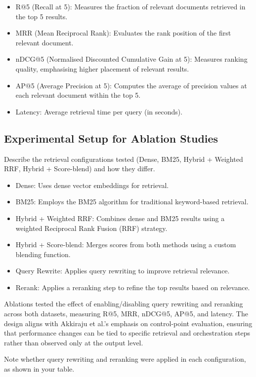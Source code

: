 \begin{spacing}{1.5}
\begin{itemize}
    \item R@5 (Recall at 5): Measures the fraction of relevant documents retrieved in the top 5 results.
    \item MRR (Mean Reciprocal Rank): Evaluates the rank position of the first relevant document.
    \item nDCG@5 (Normalised Discounted Cumulative Gain at 5): Measures ranking quality, emphasising higher placement of relevant results.
    \item AP@5 (Average Precision at 5): Computes the average of precision values at each relevant document within the top 5.
    \item Latency: Average retrieval time per query (in seconds).
\end{itemize}

\subsection{Experimental Setup for Ablation Studies}
Describe the retrieval configurations tested (Dense, BM25, Hybrid + Weighted RRF, Hybrid + Score-blend) and how they differ.
\begin{itemize}
    \item Dense: Uses dense vector embeddings for retrieval.
    \item BM25: Employs the BM25 algorithm for traditional keyword-based retrieval.
    \item Hybrid + Weighted RRF: Combines dense and BM25 results using a weighted Reciprocal Rank Fusion (RRF) strategy.
    \item Hybrid + Score-blend: Merges scores from both methods using a custom blending function.
    \item Query Rewrite: Applies query rewriting to improve retrieval relevance.
    \item Rerank: Applies a reranking step to refine the top results based on relevance.
\end{itemize}
Ablations tested the effect of enabling/disabling query rewriting and reranking across both datasets, measuring R@5, MRR, nDCG@5, AP@5, and latency.
The design aligns with Akkiraju et al.’s emphasis on control-point evaluation, ensuring that performance changes can be tied to specific retrieval and orchestration steps rather than observed only at the output level.

Note whether query rewriting and reranking were applied in each configuration, as shown in your table.




\end{spacing}
